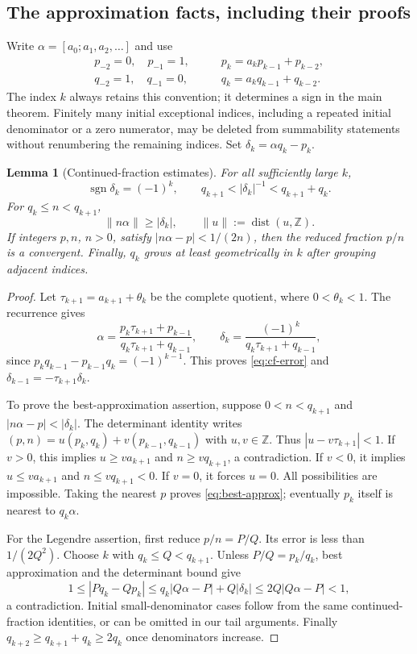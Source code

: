 \documentclass[11pt,a4paper]{article}
\numberwithin{equation}{section}
\newtheorem{lemma}[theorem]{Lemma}
\theoremstyle{definition}
\theoremstyle{remark}
\newcommand{\Z}{\mathbb Z}
\newcommand{\dist}{\operatorname{dist}}
\begin{document}
\subsection{The approximation facts, including their proofs}
Write $\alpha=[a_0;a_1,a_2,\ldots]$ and use
\begin{align*}
 p_{-2}=0,\quad p_{-1}=1,&\qquad p_k=a_kp_{k-1}+p_{k-2},\\
 q_{-2}=1,\quad q_{-1}=0,&\qquad q_k=a_kq_{k-1}+q_{k-2}.
\end{align*}
The index $k$ always retains this convention; it determines a sign in
the main theorem. Finitely many initial exceptional indices, including
a repeated initial denominator or a zero numerator, may be deleted
from summability statements without renumbering the remaining indices.
Set $\delta_k=\alpha q_k-p_k$.

\begin{lemma}[Continued-fraction estimates]
\label{lem:cf}
For all sufficiently large $k$,
\begin{equation}
 \operatorname{sgn}\delta_k=(-1)^k,\qquad
 q_{k+1}<|\delta_k|^{-1}<q_{k+1}+q_k.
 \label{eq:cf-error}
\end{equation}
For $q_k\le n<q_{k+1}$,
\begin{equation}
 \|n\alpha\|\ge|\delta_k|,
 \qquad \|u\|:=\dist(u,\Z).
 \label{eq:best-approx}
\end{equation}
If integers $p,n$, $n>0$, satisfy $|n\alpha-p|<1/(2n)$, then the reduced
fraction $p/n$ is a convergent. Finally, $q_k$ grows at least
geometrically in $k$ after grouping adjacent indices.
\end{lemma}
\begin{proof}
Let $\tau_{k+1}=a_{k+1}+\theta_k$ be the complete quotient, where
$0<\theta_k<1$. The recurrence gives
\[
 \alpha=\frac{p_k\tau_{k+1}+p_{k-1}}
               {q_k\tau_{k+1}+q_{k-1}},\qquad
 \delta_k=\frac{(-1)^k}{q_k\tau_{k+1}+q_{k-1}},
\]
since $p_kq_{k-1}-p_{k-1}q_k=(-1)^{k-1}$. This proves
\eqref{eq:cf-error} and
$\delta_{k-1}=-\tau_{k+1}\delta_k$.

To prove the best-approximation assertion, suppose $0<n<q_{k+1}$ and
$|n\alpha-p|<|\delta_k|$. The determinant identity writes
$(p,n)=u(p_k,q_k)+v(p_{k-1},q_{k-1})$ with $u,v\in\Z$. Thus
$|u-v\tau_{k+1}|<1$. If $v>0$, this implies $u\ge va_{k+1}$ and
$n\ge vq_{k+1}$, a contradiction. If $v<0$, it implies
$u\le va_{k+1}$ and $n\le vq_{k+1}<0$. If $v=0$, it forces $u=0$.
All possibilities are impossible. Taking the nearest $p$ proves
\eqref{eq:best-approx}; eventually $p_k$ itself is nearest to
$q_k\alpha$.

For the Legendre assertion, first reduce $p/n=P/Q$. Its error is less
than $1/(2Q^2)$. Choose $k$ with $q_k\le Q<q_{k+1}$. Unless
$P/Q=p_k/q_k$, best approximation and the determinant bound give
\[
 1\le|Pq_k-Qp_k|
 \le q_k|Q\alpha-P|+Q|\delta_k|
 \le2Q|Q\alpha-P|<1,
\]
a contradiction. Initial small-denominator cases follow from the same
continued-fraction identities, or can be omitted in our tail arguments.
Finally $q_{k+2}\ge q_{k+1}+q_k\ge2q_k$ once denominators increase.
\end{proof}
\end{document}
